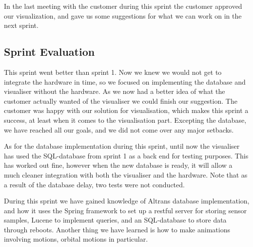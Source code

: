 \documentclass[../document]{subfiles}
\begin{document}
In the last meeting with the customer during this sprint the customer approved our visualization, and gave us some suggestions for what we can work on in the next sprint.  

\subsection{Sprint Evaluation}
This sprint went better than sprint 1. Now we knew we would not get to integrate the hardware in time, so we focused on implementing the database and visualiser without the hardware. As we now had a better idea of what the customer actually wanted of the visualiser we could finish our suggestion. The customer was happy with our solution for visualisation, which makes this sprint a success, at least when it comes to the visualisation part. Excepting the database, we have reached all our goals, and we did not come over any major setbacks.

As for the database implementation during this sprint, until now the visualiser has used the \gls{SQL}-database from sprint 1 as a back end for testing purposes. This has worked out fine, however when the new database is ready, it will allow a much cleaner integration with both the visualiser and the hardware. Note that as a result of the database delay, two tests were not conducted.

During this sprint we have gained knowledge of Altrans database implementation, and how it uses the Spring framework to set up a restful server for storing sensor samples, Lucene to implement queries, and an \gls{SQL}-database to store data through reboots. Another thing we have learned is how to make animations involving motions, orbital motions in particular.
\end{document}
